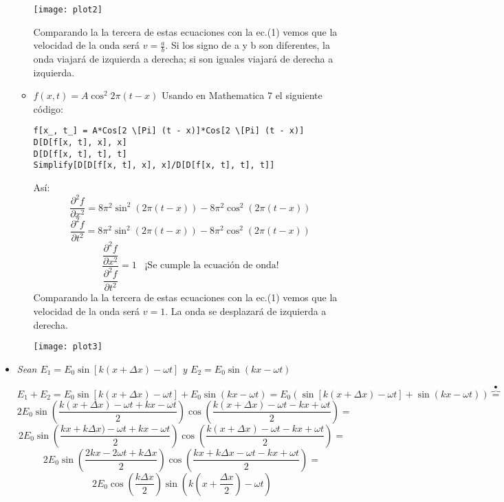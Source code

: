 \documentclass{article}
\begin{document}
\begin{itemize}
\begin{itemize}
  \centering
    \texttt{[image: plot2]}

Comparando la la tercera de estas ecuaciones con la ec.(1) vemos que la velocidad de la onda será $v=\frac{a}{b}$. Si los signo de a y b son diferentes, la onda viajará de izquierda a derecha; si son  iguales viajará de derecha a izquierda.


\item $f(x,t)=A \cos^{2} 2\pi(t-x) $
Usando en Mathematica 7 el siguiente código:
\begin{verbatim}
f[x_, t_] = A*Cos[2 \[Pi] (t - x)]*Cos[2 \[Pi] (t - x)]
D[D[f[x, t], x], x]
D[D[f[x, t], t], t]
Simplify[D[D[f[x, t], x], x]/D[D[f[x, t], t], t]]
\end{verbatim}
Así: 
$$ \frac{\partial^{2}f}{\partial x^{2}} =  8 \pi ^2 \sin ^2(2 \pi  (t-x))-8 \pi ^2 \cos ^2(2
   \pi  (t-x))$$
$$  \frac{\partial^{2}f}{\partial t^{2}}= 8 \pi ^2 \sin ^2(2 \pi  (t-x))-8 \pi ^2 \cos ^2(2
   \pi  (t-x)) $$
$$ \dfrac{\dfrac{\partial^{2}f}{\partial x^{2}}}{\dfrac{\partial^{2}f}{\partial t^{2}}}= 1 \; \; \;  \mbox{¡Se cumple la ecuación de onda!}$$
Comparando la la tercera de estas ecuaciones con la ec.(1) vemos que la velocidad de la onda será $v=1$. La onda se desplazará de izquierda a derecha.

  \centering
    \texttt{[image: plot3]}

\end{itemize}
\item \textit{Sean $E_{1}=E_{0} \sin[k(x+\Delta x)- \omega t]$ y $E_{2}=E_{0} \sin(kx- \omega t) $}

$$E_{1}+E_{2}=E_{0} \sin[k(x+\Delta x)- \omega t]+E_{0} \sin(kx- \omega t)=E_{0}(\sin[k(x+\Delta x)- \omega t]+\sin(kx- \omega t)) \overbrace{=}^ \bullet $$ $$2 E_{0} \sin \left(  \frac{k(x+\Delta x)- \omega t+kx- \omega t}{2} \right)  \cos \left(  \frac{k(x+\Delta x)- \omega t-kx+ \omega t}{2} \right) = $$ 
$$2 E_{0} \sin \left(  \frac{kx+k \Delta x)- \omega t+kx- \omega t}{2} \right)  \cos \left(  \frac{k(x+\Delta x)- \omega t-kx+ \omega t}{2} \right)  = $$
$$2E_{0} \sin \left(  \frac{2kx-2 \omega t+ k \Delta x}{2} \right) \cos \left(  \frac{kx+ k \Delta x- \omega t -kx+\omega t}{2 } \right) =$$
$$ 2E_{0} \cos \left( \frac{k \Delta x}{2} \right) \sin \left( k \left(  x + \frac{\Delta x}{2} \right) - \omega t \right)    $$


\end{itemize}
\end{document}
